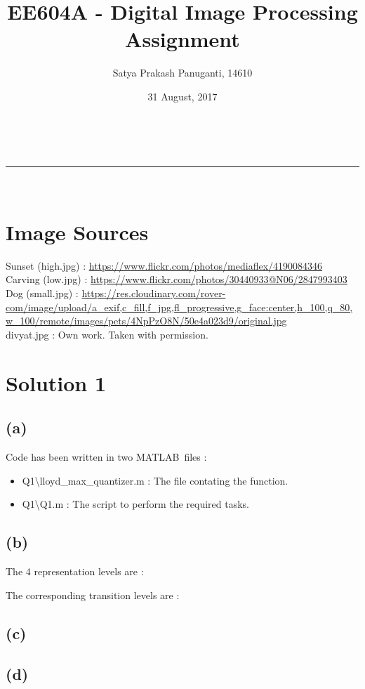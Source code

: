 \documentclass[a4paper,fleqn,11pt]{article}
\makeatletter
\newcommand{\linia}{\rule{\linewidth}{0.5pt}}
\theoremstyle{mytheor}
\renewcommand{\maketitle}{
\begin{center}
\vspace{2ex}
{\huge \textsc{\@title}}
\vspace{1ex}
\\
\linia\\
\@author \hfill \@date
\vspace{4ex}
\end{center}
}
\makeatother
\begin{document}
\title{EE604A - Digital Image Processing Assignment}

\author{Satya Prakash Panuganti, 14610}

\date{31 August, 2017}

\maketitle

\section*{Image Sources}
Sunset  (high.jpg)  : \url{https://www.flickr.com/photos/mediaflex/4190084346} \\
Carving (low.jpg)   : \url{https://www.flickr.com/photos/30440933@N06/2847993403} \\
Dog     (small.jpg) : \url{https://res.cloudinary.com/rover-com/image/upload/a_exif,c_fill,f_jpg,fl_progressive,g_face:center,h_100,q_80,w_100/remote/images/pets/4NpPzO8N/50e4a023d9/original.jpg} \\
divyat.jpg 			 : Own work. Taken with permission.
\section*{Solution 1}
\subsection*{(a)}
Code has been written in two MATLAB\textregistered\ files :
\begin{itemize}
\item Q1\textbackslash lloyd\_max\_quantizer.m : The file contating the function.
\item Q1\textbackslash Q1.m : The script to perform the required tasks.
\end{itemize}
\subsection*{(b)}
The 4 representation levels are :

The corresponding transition levels are :

\subsection*{(c)}
\subsection*{(d)}
\end{document}
